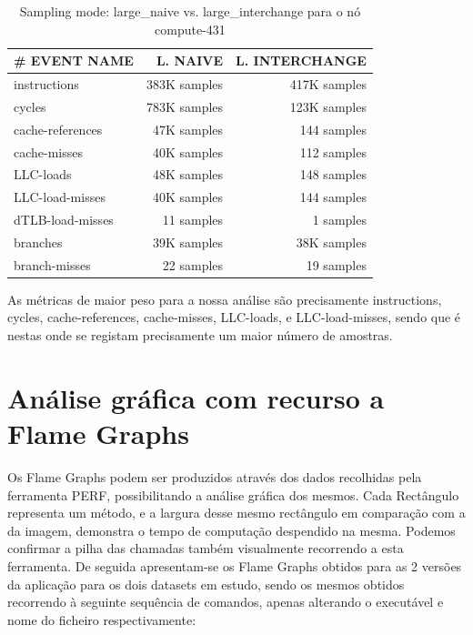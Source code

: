 \documentclass[conference,compsoc]{IEEEtran}
\begin{document}
  \begin{table}[H]
  \caption{Sampling mode: large\_naive vs. large\_interchange
    para o nó compute-431}
    \label{table:search_sampling}
    \centering
    \begin{tabular}{ | l | r | r |   }

    \hline
    \# EVENT NAME	 & L. NAIVE  & L. INTERCHANGE \\ \hline   
    instructions & 383K samples	& 417K samples  \\ \hline    
    cycles	& 783K  samples &  123K samples  \\ \hline    
    cache-references &	47K samples & 144 samples   \\ \hline    
    cache-misses & 40K samples	& 112 samples \\ \hline    
    LLC-loads	 &  48K samples &  148 samples \\ \hline    
    LLC-load-misses	& 40K samples & 144 samples  \\ \hline    
    dTLB-load-misses	& 11 samples & 1 samples \\ \hline    
    branches	&  39K samples &  38K samples \\ \hline    
    branch-misses	& 22 samples & 19 samples \\ \hline    
    \end{tabular}
    \end{table}

    As métricas de maior peso para a nossa análise são precisamente  instructions, 
    cycles, 
    cache-references,  
    cache-misses, 
    LLC-loads, e 
    LLC-load-misses, sendo que é nestas onde se registam precisamente um maior número de amostras. 


    \section{Análise gráfica com recurso a Flame Graphs}


    Os Flame Graphs podem ser produzidos através dos dados recolhidas pela ferramenta PERF, possibilitando a análise gráfica dos mesmos. Cada Rectângulo representa um método, e a largura desse mesmo rectângulo em comparação com a da imagem, demonstra o tempo de computação despendido na mesma. Podemos confirmar a pilha das chamadas também visualmente recorrendo a esta ferramenta. De seguida apresentam-se os Flame Graphs obtidos para as 2 versões da aplicação para os dois datasets em estudo, sendo os mesmos obtidos recorrendo à seguinte sequência de comandos, apenas alterando o executável e nome do ficheiro respectivamente:
\end{document}
